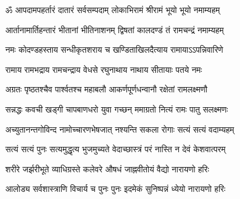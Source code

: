 
\twolineshloka
{ॐ आपदामपहर्तारं दातारं सर्वसम्पदाम्}
{लोकाभिरामं श्रीरामं भूयो भूयो नमाम्यहम्}

\twolineshloka
{आर्तानामार्तिहन्तारं भीतानां भीतिनाशनम्}
{द्विषतां कालदण्डं तं रामचन्द्रं नमाम्यहम्}

\twolineshloka
{नमः कोदण्डहस्ताय सन्धीकृतशराय च}
{खण्डिताखिलदैत्याय रामायाऽऽपन्निवारिणे}

\twolineshloka
{रामाय रामभद्राय रामचन्द्राय वेधसे}
{रघुनाथाय नाथाय सीतायाः पतये नमः}

\twolineshloka
{अग्रतः पृष्ठतश्चैव पार्श्वतश्च महाबलौ}
{आकर्णपूर्णधन्वानौ रक्षेतां रामलक्ष्मणौ}

\twolineshloka
{सन्नद्धः कवची खड्गी चापबाणधरो युवा}
{गच्छन् ममाग्रतो नित्यं रामः पातु सलक्ष्मणः}

\twolineshloka
{अच्युतानन्तगोविन्द नामोच्चारणभेषजात्}
{नश्यन्ति सकला रोगाः सत्यं सत्यं वदाम्यहम्}

\twolineshloka
{सत्यं सत्यं पुनः सत्यमुद्धृत्य भुजमुच्यते}
{वेदाच्छास्त्रं परं नास्ति न देवं केशवात्परम्}

\twolineshloka
{शरीरे जर्झरीभूते व्याधिग्रस्ते कलेवरे}
{औषधं जाह्नवीतोयं वैद्यो नारायणो हरिः}

\twolineshloka
{आलोड्य सर्वशास्त्राणि विचार्य च पुनः पुनः}
{इदमेकं सुनिष्पन्नं ध्येयो नारायणो हरिः}
